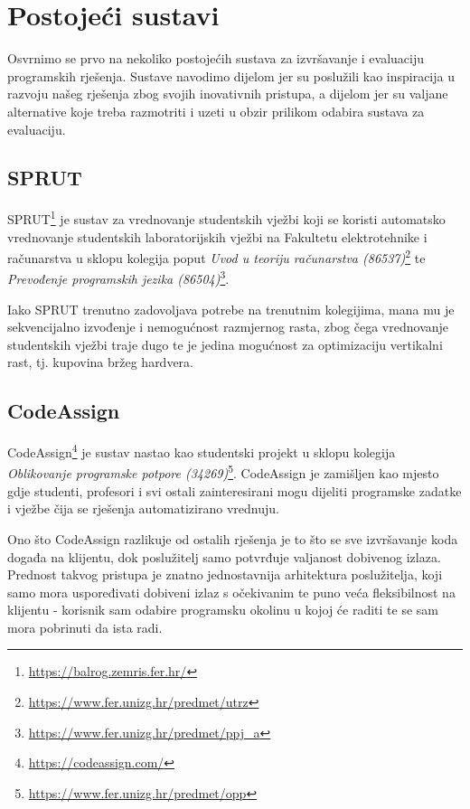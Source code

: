 \documentclass[times, utf8, zavrsni]{fer}
\begin{document}

\chapter{Postojeći sustavi}

Osvrnimo se prvo na nekoliko postojećih sustava za izvršavanje i evaluaciju programskih rješenja. Sustave navodimo dijelom jer su poslužili kao inspiracija u razvoju našeg rješenja zbog svojih inovativnih pristupa, a dijelom jer su valjane alternative koje treba razmotriti i uzeti u obzir prilikom odabira sustava za evaluaciju.

\section{SPRUT}

SPRUT{\footnote{\url{https://balrog.zemris.fer.hr/}}} je sustav za vrednovanje studentskih vježbi koji se koristi automatsko vrednovanje studentskih laboratorijskih vježbi na Fakultetu elektrotehnike i računarstva u sklopu kolegija poput {\textit{Uvod u teoriju računarstva (86537)}}{\footnote{\url{https://www.fer.unizg.hr/predmet/utrz}}} te {\textit{Prevođenje programskih jezika (86504)}}{\footnote{\url{https://www.fer.unizg.hr/predmet/ppj_a}}}.

Iako SPRUT trenutno zadovoljava potrebe na trenutnim kolegijima, mana mu je sekvencijalno izvođenje i nemogućnost razmjernog rasta, zbog čega vrednovanje studentskih vježbi traje dugo te je jedina mogućnost za optimizaciju vertikalni rast, tj. kupovina bržeg hardvera.

\section{CodeAssign}

CodeAssign{\footnote{\url{https://codeassign.com/}}} je sustav nastao kao studentski projekt u sklopu kolegija {\textit{Oblikovanje programske potpore (34269)}}{\footnote{\url{https://www.fer.unizg.hr/predmet/opp}}}. CodeAssign je zamišljen kao mjesto gdje studenti, profesori i svi ostali zainteresirani mogu dijeliti programske zadatke i vježbe čija se rješenja automatizirano vrednuju.

Ono što CodeAssign razlikuje od ostalih rješenja je to što se sve izvršavanje koda događa na klijentu, dok poslužitelj samo potvrđuje valjanost dobivenog izlaza. Prednost takvog pristupa je znatno jednostavnija arhitektura poslužitelja, koji samo mora uspoređivati dobiveni izlaz s očekivanim te puno veća fleksibilnost na klijentu - korisnik sam odabire programsku okolinu u kojoj će raditi te se sam mora pobrinuti da ista radi.
\end{document}
